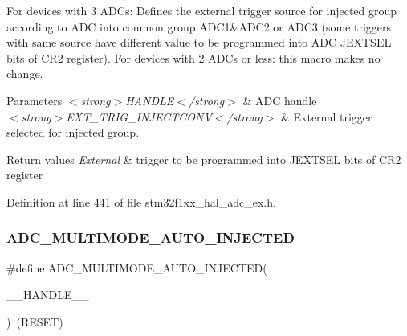 For devices with 3 A\+D\+Cs\+: Defines the external trigger source for injected group according to A\+DC into common group A\+D\+C1\&A\+D\+C2 or A\+D\+C3 (some triggers with same source have different value to be programmed into A\+DC J\+E\+X\+T\+S\+EL bits of C\+R2 register). For devices with 2 A\+D\+Cs or less\+: this macro makes no change. 


\begin{DoxyParams}{Parameters}
{\em $<$strong$>$\+H\+A\+N\+D\+L\+E$<$/strong$>$} & A\+DC handle \\
\hline
{\em $<$strong$>$\+E\+X\+T\+\_\+\+T\+R\+I\+G\+\_\+\+I\+N\+J\+E\+C\+T\+C\+O\+N\+V$<$/strong$>$} & External trigger selected for injected group. \\
\hline
\end{DoxyParams}

\begin{DoxyRetVals}{Return values}
{\em External} & trigger to be programmed into J\+E\+X\+T\+S\+EL bits of C\+R2 register \\
\hline
\end{DoxyRetVals}


Definition at line 441 of file stm32f1xx\+\_\+hal\+\_\+adc\+\_\+ex.\+h.

\mbox{\label{group___a_d_c_ex___private___macro_gaa359107fadfc631d25f798aad7c857fd}} 
\subsubsection{\texorpdfstring{A\+D\+C\+\_\+\+M\+U\+L\+T\+I\+M\+O\+D\+E\+\_\+\+A\+U\+T\+O\+\_\+\+I\+N\+J\+E\+C\+T\+ED}{ADC\_MULTIMODE\_AUTO\_INJECTED}}
{\footnotesize\ttfamily \#define A\+D\+C\+\_\+\+M\+U\+L\+T\+I\+M\+O\+D\+E\+\_\+\+A\+U\+T\+O\+\_\+\+I\+N\+J\+E\+C\+T\+ED(\begin{DoxyParamCaption}\item[{}]{\+\_\+\+\_\+\+H\+A\+N\+D\+L\+E\+\_\+\+\_\+ }\end{DoxyParamCaption})~(R\+E\+S\+ET)}



